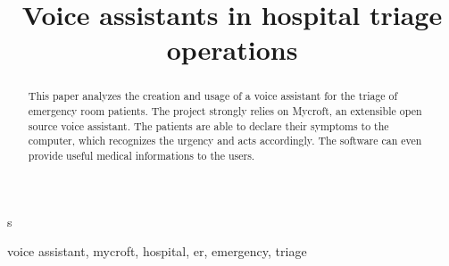 \documentclass[conference]{IEEEtran}
\begin{document}
s

\title{Voice assistants in hospital triage operations}

\author{
    \and
    \and
}

\maketitle

\begin{abstract}
    This paper analyzes the creation and usage of a voice assistant for the triage of emergency room patients. The project strongly relies on Mycroft, an extensible open source voice assistant. The patients are able to declare their symptoms to the computer, which recognizes the urgency and acts accordingly. The software can even provide useful medical informations to the users.
\end{abstract}

\begin{IEEEkeywords}
    voice assistant, mycroft, hospital, er, emergency, triage
\end{IEEEkeywords}
\end{document}
